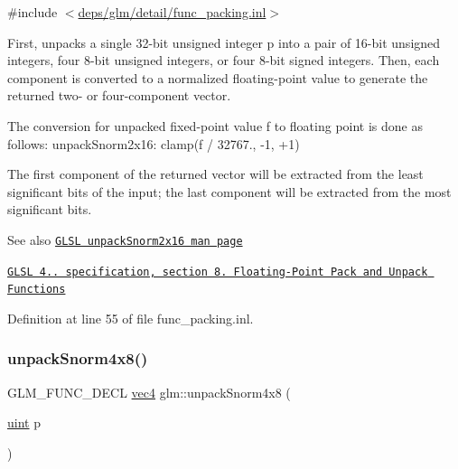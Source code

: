 {\ttfamily \#include $<$\hyperlink{func__packing_8inl}{deps/glm/detail/func\+\_\+packing.\+inl}$>$}

First, unpacks a single 32-\/bit unsigned integer p into a pair of 16-\/bit unsigned integers, four 8-\/bit unsigned integers, or four 8-\/bit signed integers. Then, each component is converted to a normalized floating-\/point value to generate the returned two-\/ or four-\/component vector.

The conversion for unpacked fixed-\/point value f to floating point is done as follows\+: unpack\+Snorm2x16\+: clamp(f / 32767., -\/1, +1)

The first component of the returned vector will be extracted from the least significant bits of the input; the last component will be extracted from the most significant bits.

\begin{DoxySeeAlso}{See also}
\href{http://www.opengl.org/sdk/docs/manglsl/xhtml/unpackSnorm2x16.xml}{\tt G\+L\+SL unpack\+Snorm2x16 man page} 

\href{http://www.opengl.org/registry/doc/GLSLangSpec.4.20.8.pdf}{\tt G\+L\+SL 4.. specification, section 8. Floating-\/\+Point Pack and Unpack Functions} 
\end{DoxySeeAlso}


Definition at line 55 of file func\+\_\+packing.\+inl.

\mbox{\label{group__core__func__packing_ga2db488646d48b7c43d3218954523fe82}} 
\subsubsection{\texorpdfstring{unpack\+Snorm4x8()}{unpackSnorm4x8()}}
{\footnotesize\ttfamily G\+L\+M\+\_\+\+F\+U\+N\+C\+\_\+\+D\+E\+CL \hyperlink{group__core__types_ga5881b1b022d7fd1b7218f5916532dd02}{vec4} glm\+::unpack\+Snorm4x8 (\begin{DoxyParamCaption}\item[{\hyperlink{group__core__precision_ga4fd29415871152bfb5abd588334147c8}{uint}}]{p }\end{DoxyParamCaption})}



